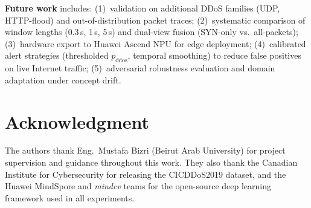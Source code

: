 \documentclass[conference]{IEEEtran}
\begin{document}
\textbf{Future work} includes:
(1)~validation on additional DDoS families (UDP, HTTP-flood) and out-of-distribution
packet traces;
(2)~systematic comparison of window lengths (0.3\,s, 1\,s, 5\,s) and
dual-view fusion (SYN-only vs.\ all-packets);
(3)~hardware export to Huawei Ascend NPU for edge deployment;
(4)~calibrated alert strategies (thresholded $p_\text{ddos}$, temporal
smoothing) to reduce false positives on live Internet traffic;
(5)~adversarial robustness evaluation and domain adaptation under concept drift.

\section*{Acknowledgment}
The authors thank Eng.\ Mustafa Bizri (Beirut Arab University) for project
supervision and guidance throughout this work.
They also thank the Canadian Institute for Cybersecurity for releasing the
CICDDoS2019 dataset, and the Huawei MindSpore and \textit{mindcv} teams
for the open-source deep learning framework used in all experiments.



\end{document}
